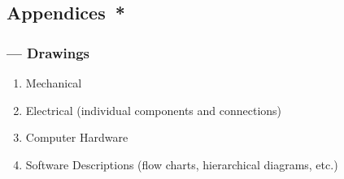 \documentclass[twocolumn]{article}
\begin{document}







 














\subsection*{Appendices{\color{red}\ *}}
\subsubsection*{ --- Drawings}
\begin{enumerate}
\item{Mechanical}
\item{Electrical (individual components and connections)}
\item{Computer Hardware}
\item{Software Descriptions (flow charts, hierarchical diagrams, etc.)}
\end{enumerate}
\end{document}
